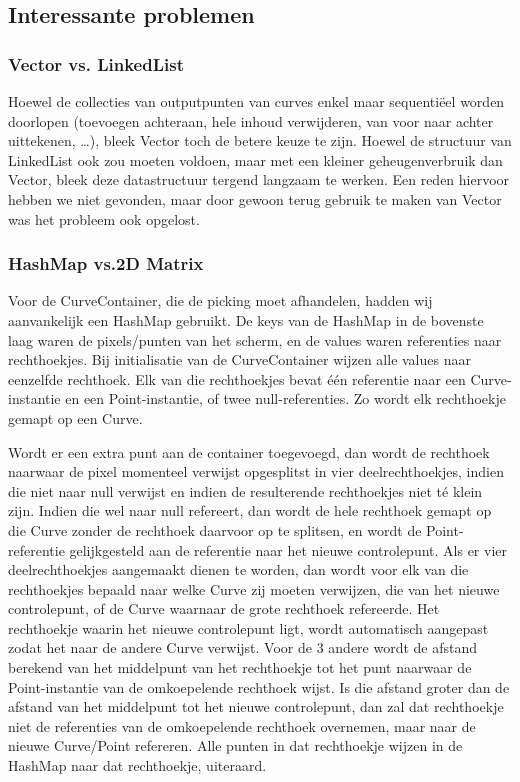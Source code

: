 \documentclass[a4paper,11pt,oneside, titlepage]{article}
\begin{document}
\subsection{Interessante problemen}
\subsubsection{Vector vs. LinkedList}
Hoewel de collecties van outputpunten van curves enkel maar sequentiëel worden doorlopen (toevoegen achteraan, hele inhoud verwijderen, van voor naar achter uittekenen, \ldots), bleek Vector toch de betere keuze te zijn.
Hoewel de structuur van LinkedList ook zou moeten voldoen, maar met een kleiner geheugenverbruik dan Vector, bleek deze datastructuur tergend langzaam te werken. Een reden hiervoor hebben we niet gevonden, maar door gewoon terug gebruik te maken van Vector was het probleem ook opgelost.
\subsubsection{HashMap vs.2D Matrix}
Voor de CurveContainer, die de picking moet afhandelen, hadden wij aanvankelijk een HashMap gebruikt. De keys van de HashMap in de bovenste laag waren de pixels/punten van het scherm, en de values waren referenties naar rechthoekjes. Bij initialisatie van de CurveContainer wijzen alle values naar eenzelfde rechthoek. Elk van die rechthoekjes bevat \'e\'en referentie naar een Curve-instantie en een Point-instantie, of twee null-referenties. Zo wordt elk rechthoekje gemapt op een Curve.

Wordt er een extra punt aan de container toegevoegd, dan wordt de rechthoek naarwaar de pixel momenteel verwijst opgesplitst in vier deelrechthoekjes, indien die niet naar null verwijst en indien de resulterende rechthoekjes niet t\'e klein zijn. Indien die wel naar null refereert, dan wordt de hele rechthoek gemapt op die Curve zonder de rechthoek daarvoor op te splitsen, en wordt de Point-referentie gelijkgesteld aan de referentie naar het nieuwe controlepunt. Als er vier deelrechthoekjes aangemaakt dienen te worden, dan wordt voor elk van die rechthoekjes bepaald naar welke Curve zij moeten verwijzen, die van het nieuwe controlepunt, of de Curve waarnaar de grote rechthoek refereerde. Het rechthoekje waarin het nieuwe controlepunt ligt, wordt automatisch aangepast zodat het naar de andere Curve verwijst. Voor de 3 andere wordt de afstand berekend van het middelpunt van het rechthoekje tot het punt naarwaar de Point-instantie van de omkoepelende rechthoek wijst. Is die afstand groter dan de afstand van het middelpunt tot het nieuwe controlepunt, dan zal dat rechthoekje niet de referenties van de omkoepelende rechthoek overnemen, maar naar de nieuwe Curve/Point refereren.
Alle punten in dat rechthoekje wijzen in de HashMap naar dat rechthoekje, uiteraard.
\end{document}
